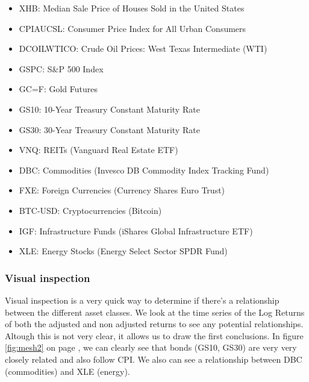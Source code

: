 \documentclass{article}
\begin{document}
\begin{itemize}
    \item XHB: Median Sale Price of Houses Sold in the United States
    \item CPIAUCSL: Consumer Price Index for All Urban Consumers
    \item DCOILWTICO: Crude Oil Prices: West Texas Intermediate (WTI)
    \item GSPC: S\&P 500 Index
    \item GC=F: Gold Futures
    \item GS10: 10-Year Treasury Constant Maturity Rate
    \item GS30: 30-Year Treasury Constant Maturity Rate
    \item VNQ: REITs (Vanguard Real Estate ETF)
    \item DBC: Commodities (Invesco DB Commodity Index Tracking Fund)
    \item FXE: Foreign Currencies (Currency Shares Euro Trust)
    \item BTC-USD: Cryptocurrencies (Bitcoin)
    \item IGF: Infrastructure Funds (iShares Global Infrastructure ETF)
    \item XLE: Energy Stocks (Energy Select Sector SPDR Fund)
\end{itemize}


\subsubsection*{Visual inspection}

Visual inspection is a very quick way to determine if there's a relationship between the different asset classes. We look at the time series of the Log Returns of both the adjusted and non adjusted returns to see any potential relationships. Altough this is not very clear, it allows us to draw the first conclusions. In figure \ref{fig:mesh2} on page \pageref{fig:mesh2}, we can clearly see that bonds (GS10, GS30) are very very closely related and also follow CPI. We also can see a relationship between DBC (commodities) and XLE (energy).
\end{document}
